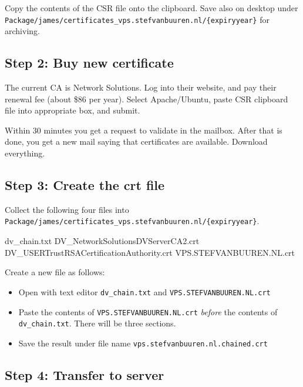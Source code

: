 \documentclass[
]{book}
\newenvironment{Shaded}{\begin{snugshade}}{\end{snugshade}}
\newcommand{\ExtensionTok}[1]{#1}
\providecommand{\tightlist}{%
  \setlength{\itemsep}{0pt}\setlength{\parskip}{0pt}}
\begin{document}
Copy the contents of the CSR file onto the clipboard. Save also on desktop under \texttt{Package/james/certificates\_vps.stefvanbuuren.nl/\{expiryyear\}} for archiving.

\hypertarget{step-2-buy-new-certificate}{%
\subsection{Step 2: Buy new certificate}\label{step-2-buy-new-certificate}}

The current CA is Network Solutions. Log into their website, and pay their renewal fee (about \$86 per year). Select Apache/Ubuntu, paste CSR clipboard file into appropriate box, and submit.

Within 30 minutes you get a request to validate in the mailbox. After that is done, you get a new mail saying that certificates are available. Download everything.

\hypertarget{step-3-create-the-crt-file}{%
\subsection{Step 3: Create the crt file}\label{step-3-create-the-crt-file}}

Collect the following four files into \texttt{Package/james/certificates\_vps.stefvanbuuren.nl/\{expiryyear\}}.

\begin{Shaded}
\begin{Highlighting}[]
\ExtensionTok{dv\_chain.txt}
\ExtensionTok{DV\_NetworkSolutionsDVServerCA2.crt}
\ExtensionTok{DV\_USERTrustRSACertificationAuthority.crt}
\ExtensionTok{VPS.STEFVANBUUREN.NL.crt}
\end{Highlighting}
\end{Shaded}

Create a new file as follows:

\begin{itemize}
\tightlist
\item
  Open with text editor \texttt{dv\_chain.txt} and \texttt{VPS.STEFVANBUUREN.NL.crt}
\item
  Paste the contents of \texttt{VPS.STEFVANBUUREN.NL.crt} \emph{before} the contents of \texttt{dv\_chain.txt}. There will be three sections.
\item
  Save the result under file name \texttt{vps.stefvanbuuren.nl.chained.crt}
\end{itemize}

\hypertarget{step-4-transfer-to-server}{%
\subsection{Step 4: Transfer to server}\label{step-4-transfer-to-server}}
\end{document}
